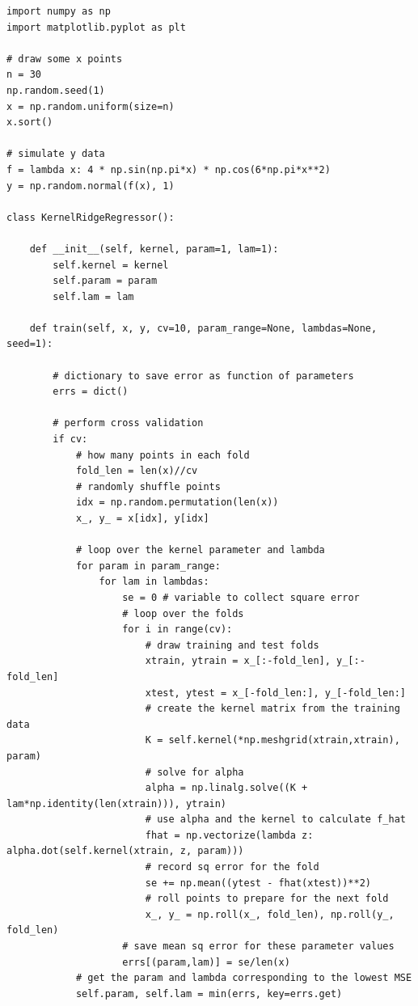 \documentclass{article}
\begin{document}
\begin{verbatim}
import numpy as np
import matplotlib.pyplot as plt

# draw some x points
n = 30
np.random.seed(1)
x = np.random.uniform(size=n)
x.sort()

# simulate y data
f = lambda x: 4 * np.sin(np.pi*x) * np.cos(6*np.pi*x**2)
y = np.random.normal(f(x), 1)

class KernelRidgeRegressor():
    
    def __init__(self, kernel, param=1, lam=1):
        self.kernel = kernel
        self.param = param
        self.lam = lam
        
    def train(self, x, y, cv=10, param_range=None, lambdas=None, seed=1):
        
        # dictionary to save error as function of parameters
        errs = dict()
        
        # perform cross validation
        if cv:
            # how many points in each fold
            fold_len = len(x)//cv
            # randomly shuffle points
            idx = np.random.permutation(len(x))
            x_, y_ = x[idx], y[idx]
            
            # loop over the kernel parameter and lambda
            for param in param_range:
                for lam in lambdas:
                    se = 0 # variable to collect square error
                    # loop over the folds
                    for i in range(cv):
                        # draw training and test folds
                        xtrain, ytrain = x_[:-fold_len], y_[:-fold_len]
                        xtest, ytest = x_[-fold_len:], y_[-fold_len:]
                        # create the kernel matrix from the training data
                        K = self.kernel(*np.meshgrid(xtrain,xtrain), param)
                        # solve for alpha
                        alpha = np.linalg.solve((K + lam*np.identity(len(xtrain))), ytrain)
                        # use alpha and the kernel to calculate f_hat
                        fhat = np.vectorize(lambda z: alpha.dot(self.kernel(xtrain, z, param)))
                        # record sq error for the fold
                        se += np.mean((ytest - fhat(xtest))**2)
                        # roll points to prepare for the next fold
                        x_, y_ = np.roll(x_, fold_len), np.roll(y_, fold_len)
                    # save mean sq error for these parameter values
                    errs[(param,lam)] = se/len(x)
            # get the param and lambda corresponding to the lowest MSE
            self.param, self.lam = min(errs, key=errs.get)
        

\end{verbatim}
\end{document}
